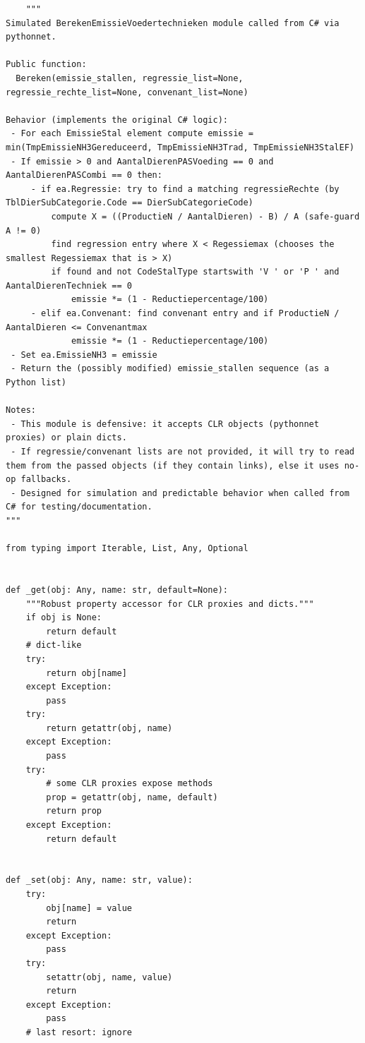   \begin{verbatim}
    """
Simulated BerekenEmissieVoedertechnieken module called from C# via pythonnet.

Public function:
  Bereken(emissie_stallen, regressie_list=None, regressie_rechte_list=None, convenant_list=None)

Behavior (implements the original C# logic):
 - For each EmissieStal element compute emissie = min(TmpEmissieNH3Gereduceerd, TmpEmissieNH3Trad, TmpEmissieNH3StalEF)
 - If emissie > 0 and AantalDierenPASVoeding == 0 and AantalDierenPASCombi == 0 then:
     - if ea.Regressie: try to find a matching regressieRechte (by TblDierSubCategorie.Code == DierSubCategorieCode)
         compute X = ((ProductieN / AantalDieren) - B) / A (safe-guard A != 0)
         find regression entry where X < Regessiemax (chooses the smallest Regessiemax that is > X)
         if found and not CodeStalType startswith 'V ' or 'P ' and AantalDierenTechniek == 0
             emissie *= (1 - Reductiepercentage/100)
     - elif ea.Convenant: find convenant entry and if ProductieN / AantalDieren <= Convenantmax
             emissie *= (1 - Reductiepercentage/100)
 - Set ea.EmissieNH3 = emissie
 - Return the (possibly modified) emissie_stallen sequence (as a Python list)

Notes:
 - This module is defensive: it accepts CLR objects (pythonnet proxies) or plain dicts.
 - If regressie/convenant lists are not provided, it will try to read them from the passed objects (if they contain links), else it uses no-op fallbacks.
 - Designed for simulation and predictable behavior when called from C# for testing/documentation.
"""

from typing import Iterable, List, Any, Optional


def _get(obj: Any, name: str, default=None):
    """Robust property accessor for CLR proxies and dicts."""
    if obj is None:
        return default
    # dict-like
    try:
        return obj[name]
    except Exception:
        pass
    try:
        return getattr(obj, name)
    except Exception:
        pass
    try:
        # some CLR proxies expose methods
        prop = getattr(obj, name, default)
        return prop
    except Exception:
        return default


def _set(obj: Any, name: str, value):
    try:
        obj[name] = value
        return
    except Exception:
        pass
    try:
        setattr(obj, name, value)
        return
    except Exception:
        pass
    # last resort: ignore



\end{verbatim}
